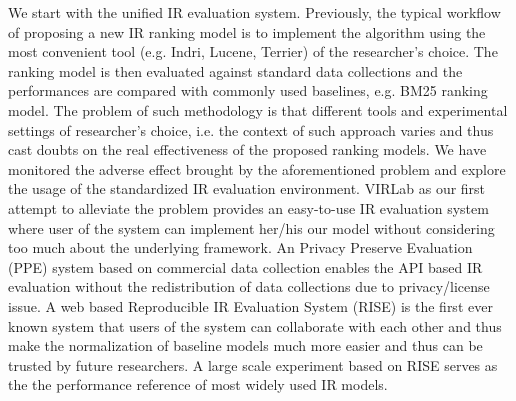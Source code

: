 We start with the unified IR evaluation system. Previously, the typical 
workflow of proposing a new IR ranking model is to implement the algorithm 
using the most convenient tool (e.g. Indri, Lucene, Terrier) of the 
researcher's choice. The ranking model is then evaluated against standard 
data collections and the performances are compared with commonly used 
baselines, e.g. BM25 ranking model. The problem of such methodology is that 
different tools and experimental settings of researcher's choice, i.e. the 
context of such approach varies and thus cast doubts on the real effectiveness 
of the proposed ranking models. 
We have monitored the adverse effect brought by the aforementioned problem and 
explore the usage of the standardized IR evaluation environment. 
VIRLab as our first attempt to alleviate the problem provides an easy-to-use 
IR evaluation system where user of the system can implement her/his our model 
without considering too much about the underlying framework. 
An Privacy Preserve Evaluation (PPE) system based on commercial data 
collection enables the API based IR evaluation without the redistribution 
of data collections due to privacy/license issue.
A web based Reproducible IR Evaluation System (RISE) is the first ever known 
system that users of the system can collaborate with each other and thus make 
the normalization of baseline models much more easier and thus can be trusted 
by future researchers. A large scale experiment based on RISE serves as the 
the performance reference of most widely used IR models.

















